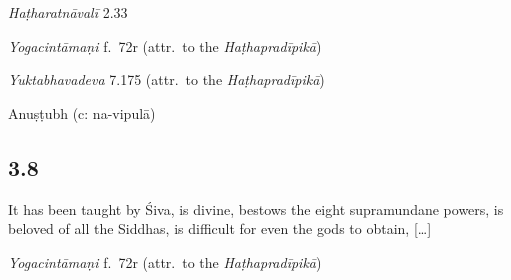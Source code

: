 \begin{ekdosis}
\begin{testimonia}[hp03_007]
\emph{Haṭharatnāvalī} 2.33
\begin{versinnote}
\end{versinnote}

\emph{Yogacintāmaṇi} f.~72r (attr.~to the \emph{Haṭhapradīpikā})
\begin{versinnote}
\end{versinnote}

\emph{Yuktabhavadeva} 7.175 (attr.~to the \emph{Haṭhapradīpikā})
\begin{versinnote}
\end{versinnote}

\end{testimonia}


\begin{metre}[hp03_007]
Anuṣṭubh (c: na-vipulā)
\end{metre}

\subsection*{3.8}
\begin{translation}[hp03_008]
It has been taught by Śiva, is divine, bestows the eight supramundane powers, is beloved of all the Siddhas, is difficult for even the gods to obtain, [\dots] 
\end{translation}

\begin{sources}[hp03_008]
\end{sources}

\begin{testimonia}[hp03_008]
\emph{Yogacintāmaṇi} f.~72r (attr.~to the \emph{Haṭhapradīpikā})
\begin{versinnote}
\end{versinnote}


\end{testimonia}
\end{ekdosis}
